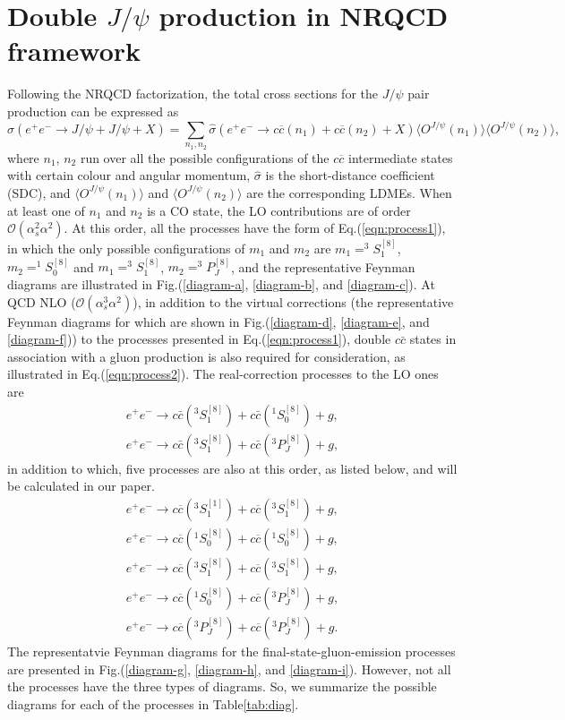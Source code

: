 \documentclass[preprint,showpacs,preprintnumbers,amssymb,aps]{revtex4}
\def\be{\begin{equation}}
\def\ee{\end{equation}}
\def\bea{\begin{eqnarray}}
\def\eea{\end{eqnarray}}
\def\NO{\nonumber}
\begin{document}
\section{Double $J/\psi$ production in NRQCD framework} \label{cha:2}
Following the NRQCD factorization, the total cross sections for the $J/\psi$ pair production can be expressed as
\be
\sigma(e^+e^-\rightarrow J/\psi+J/\psi+X)=\sum_{n_1,n_2}\hat{\sigma}(e^+e^-\rightarrow c\overline{c}(n_1)+c\overline{c}(n_2)+X)\langle O^{J/\psi}(n_1)\rangle\langle O^{J/\psi}(n_2)\rangle, \label{eqn:total}
\ee
where $n_1$, $n_2$ run over all the possible configurations of the $c\overline{c}$ intermediate states with certain colour and angular momentum,
$\hat{\sigma}$ is the short-distance coefficient (SDC),
and $\langle O^{J/\psi}(n_1)\rangle$ and $\langle O^{J/\psi}(n_2)\rangle$ are the corresponding LDMEs.
When at least one of $n_1$ and $n_2$ is a CO state, the LO contributions are of order $\mathcal{O}(\alpha_s^2\alpha^2)$.
At this order, all the processes have the form of Eq.(\ref{eqn:process1}),
in which the only possible configurations of $m_1$ and $m_2$ are $m_1=^3S_1^{[8]}$, $m_2=^1S_0^{[8]}$ and $m_1=^3S_1^{[8]}$, $m_2=^3P_J^{[8]}$,
and the representative Feynman diagrams are illustrated in Fig.(\ref{diagram-a}, \ref{diagram-b}, and \ref{diagram-c}).
At QCD NLO ($\mathcal{O}(\alpha_s^3\alpha^2)$), in addition to the virtual corrections
(the representative Feynman diagrams for which are shown in Fig.(\ref{diagram-d}, \ref{diagram-e}, and \ref{diagram-f}))
to the processes presented in Eq.(\ref{eqn:process1}),
double $c\bar{c}$ states in association with a gluon production is also required for consideration, as illustrated in Eq.(\ref{eqn:process2}).
The real-correction processes to the LO ones are
\bea
e^+e^-\rightarrow c\bar{c}(^3S_1^{[8]})+c\bar{c}(^1S_0^{[8]})+g, \NO \\
e^+e^-\rightarrow c\bar{c}(^3S_1^{[8]})+c\bar{c}(^3P_J^{[8]})+g, \label{eqn:process2a}
\eea
in addition to which, five processes are also at this order, as listed below, and will be calculated in our paper.
\bea
e^+e^-\rightarrow c\overline{c}(^3S_1^{[1]})+ c\overline{c}(^3S_1^{[8]})+g, \label{eqn:process2b1} \\
e^+e^-\rightarrow c\overline{c}(^1S_0^{[8]})+ c\overline{c}(^1S_0^{[8]})+g, \label{eqn:process2b2} \\
e^+e^-\rightarrow c\overline{c}(^3S_1^{[8]})+ c\overline{c}(^3S_1^{[8]})+g, \label{eqn:process2b3} \\
e^+e^-\rightarrow c\overline{c}(^1S_0^{[8]})+ c\overline{c}(^3P_J^{[8]})+g, \label{eqn:process2b4} \\
e^+e^-\rightarrow c\overline{c}(^3P_J^{[8]})+ c\overline{c}(^3P_J^{[8]})+g. \label{eqn:process2b5}
\eea
The representatvie Feynman diagrams for the final-state-gluon-emission processes are presented in Fig.(\ref{diagram-g}, \ref{diagram-h}, and \ref{diagram-i}).
However, not all the processes have the three types of diagrams.
So, we summarize the possible diagrams for each of the processes in Table\ref{tab:diag}.
\end{document}
